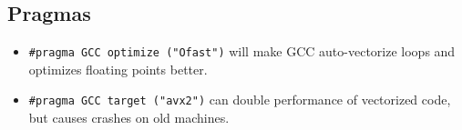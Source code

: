 \subsection{Pragmas}
	\begin{itemize}
		\item \lstinline{#pragma GCC optimize ("Ofast")} will make GCC auto-vectorize loops and optimizes floating points better.
		\item \lstinline{#pragma GCC target ("avx2")} can double performance of vectorized code, but causes crashes on old machines.
	\end{itemize}
